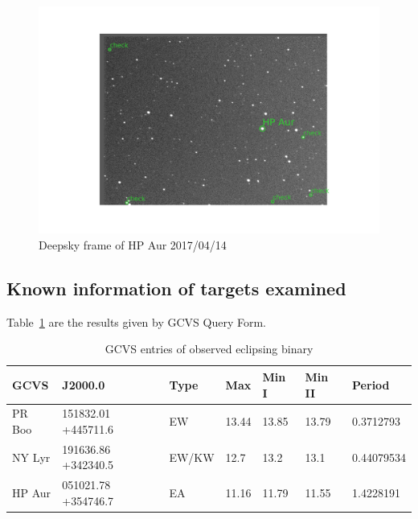 \begin{figure}[h]
    \centering
    \includegraphics[width=\columnwidth]{figures/deepsky_hpaur_170413.png}
    \caption{Deepsky frame of HP Aur 2017/04/14}
\label{fig:deepskyhpaur}
\end{figure}

\subsection{Known information of targets examined}
Table~\ref{tab:gcvs} are the results given by GCVS Query Form.
\begin{table}[h]
    \centering
    \begin{tabular}{l l l l l l l }
        \toprule
        GCVS & J2000.0 & Type & Max & Min I & Min II & Period \\ \bottomrule
        PR Boo & 151832.01 +445711.6 & EW & 13.44 & 13.85 & 13.79 & 0.3712793 \\ \midrule
        NY Lyr & 191636.86 +342340.5 & EW/KW & 12.7 & 13.2 & 13.1 & 0.44079534 \\ \midrule
        HP Aur & 051021.78 +354746.7 & EA & 11.16  & 11.79 & 11.55 & 1.4228191 \\   
    \bottomrule
    \end{tabular}
    \caption{GCVS entries of observed eclipsing binary}
\label{tab:gcvs}
\end{table}

